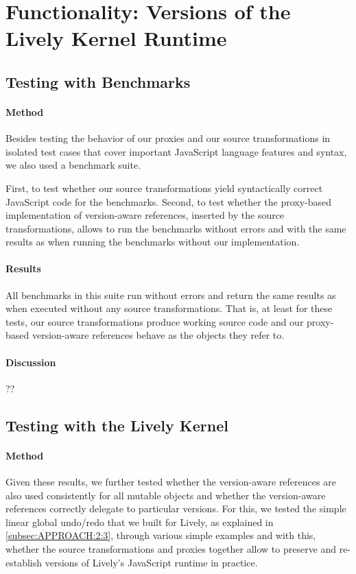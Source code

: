 \section{Functionality: Versions of the Lively Kernel Runtime} \label{sec:DISCUSSION:1}


\subsection{Testing with Benchmarks}

\paragraph{Method}
Besides testing the behavior of our proxies and our source transformations in isolated test cases that cover important JavaScript language features and syntax, we also used a benchmark suite.

First, to test whether our source transformations yield syntactically correct JavaScript code for the benchmarks.
Second, to test whether the proxy-based implementation of version-aware references, inserted by the source transformations, allows to run the benchmarks without errors and with the same results as when running the benchmarks without our implementation.


\paragraph{Results}
All benchmarks in this suite run without errors and return the same results as when executed without any source transformations.
That is, at least for these tests, our source transformations produce working source code and our proxy-based version-aware references behave as the objects they refer to.

\paragraph{Discussion}
??


\subsection{Testing with the Lively Kernel}

\paragraph{Method}
Given these results, we further tested whether the version-aware references are also used consistently for all mutable objects and whether the version-aware references correctly delegate to particular versions.
For this, we tested the simple linear global undo/redo that we built for Lively, as explained in \ref{subsec:APPROACH:2:3}, through various simple examples and with this, whether the source transformations and proxies together allow to preserve and re-establish versions of Lively's JavaScript runtime in practice.

